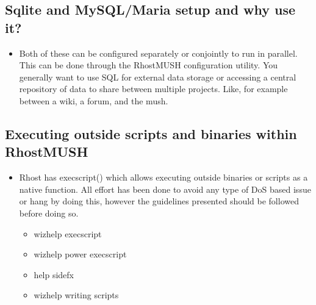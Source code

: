 \documentclass[letterpaper,10pt,english]{sphinxmanual}
\begin{document}
\subsection{Sqlite and MySQL/Maria setup and why use it?}
\label{\detokenize{features:sqlite-and-mysql-maria-setup-and-why-use-it}}\begin{itemize}
\item {} 
\sphinxAtStartPar
Both of these can be configured separately or conjointly to
run in parallel.  This can be done through the RhostMUSH
configuration utility.  You generally want to use SQL for
external data storage or accessing a central repository
of data to share between multiple projects.  Like, for
example between a wiki, a forum, and the mush.

\end{itemize}


\subsection{Executing outside scripts and binaries within RhostMUSH}
\label{\detokenize{features:executing-outside-scripts-and-binaries-within-rhostmush}}\begin{itemize}
\item {} 
\sphinxAtStartPar
Rhost has execscript() which allows executing outside binaries
or scripts as a native function.  All effort has been done to
avoid any type of DoS based issue or hang by doing this, however
the guidelines presented should be followed before doing so.
\begin{itemize}
\item {} 
\sphinxAtStartPar
wizhelp execscript

\item {} 
\sphinxAtStartPar
wizhelp power execscript

\item {} 
\sphinxAtStartPar
help sidefx

\item {} 
\sphinxAtStartPar
wizhelp writing scripts

\end{itemize}

\end{itemize}
\end{document}
